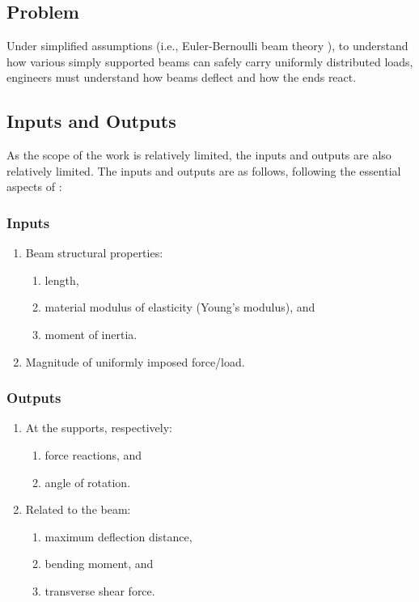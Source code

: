 \documentclass{article}
\begin{document}
\subsection{Problem}
\label{problem-statement:problem}

Under simplified assumptions (i.e., Euler-Bernoulli beam theory
\cite{EulerBernoulliWiki}), to understand how various simply supported beams can
safely carry uniformly distributed loads, engineers must understand how beams
deflect and how the ends react.

\subsection{Inputs and Outputs}
\label{problem-statement:inputs-and-outputs}

As the scope of the work is relatively limited, the inputs and outputs are also
relatively limited. The inputs and outputs are as follows, following the
essential aspects of \cite{Lemonis2022}:

\subsubsection{Inputs}
\label{problem-statement:inputs-and-outputs:inputs}

\begin{enumerate}
    \item Beam structural properties:
        \begin{enumerate}
            \item length,
            \item material modulus of elasticity (Young's modulus), and
            \item moment of inertia.
        \end{enumerate}
    \item Magnitude of uniformly imposed force/load.
\end{enumerate}

\subsubsection{Outputs}

\begin{enumerate}
    \item At the supports, respectively:
        \begin{enumerate}
            \item force reactions, and
            \item angle of rotation.
        \end{enumerate}
    
    \item Related to the beam:
        \begin{enumerate}
            \item maximum deflection distance,
            \item bending moment, and
            \item transverse shear force.
        \end{enumerate}
\end{enumerate}
\end{document}
